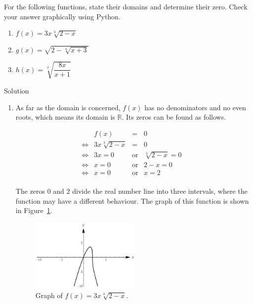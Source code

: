 \ifpython
\begin{example}  For the following functions, state their domains and determine their zero.  Check your answer graphically using Python.

\begin{multicols}{2}
\begin{enumerate}

\item  $f(x) = 3x \sqrt[3]{2-x}$

\ifanalysis \item  $g(x) = \sqrt{2-\sqrt[4]{x+3}}$\fi


\ifvc\item  $h(x) = \sqrt[3]{\dfrac{8x}{x+1}}$\fi

\end{enumerate}
\end{multicols}

Solution 



\begin{enumerate}

\item  As far as the domain is concerned, $f(x)$ has no denominators and no even roots, which means its domain is $\mathbb{R}$.  Its zeros can be found as follows.

\[ \begin{array}{rrclr}

&f(x) & = & 0 & \\

\Leftrightarrow&3x \sqrt[3]{2-x} & = & 0 \\

\Leftrightarrow&3x = 0 & \mbox{or} & \sqrt[3]{2-x} = 0 & \\

\Leftrightarrow&x = 0 & \mbox{or} & 2-x = 0 & \\

\Leftrightarrow&x = 0 & \mbox{or} & x=2 & \\

\end{array}\]


The zeros $0$ and $2$ divide the real number line into three intervals, where the function may have a different behaviour. The graph of this function is shown in Figure~\ref{fig_algebraic_15}.
\begin{figure}[H]
    \begin{center}
			\includegraphics[width=0.5\textwidth]{fig_algebraic_15}
	\end{center}
    \caption{Graph of $f(x) = 3x \sqrt[3]{2-x}$.}
    \label{fig_algebraic_15}
\end{figure}
  

\end{enumerate}
\end{example}
